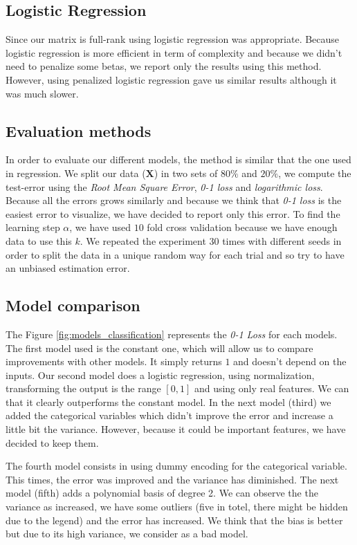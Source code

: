 \documentclass{article} %
\begin{document}
\subsection{Logistic Regression}

Since our matrix is full-rank using logistic regression was appropriate. Because logistic regression is more efficient in term of complexity and because we didn't need to penalize some betas, we report only the results using this method. However, using penalized logistic regression gave us similar results although it was much slower.

\subsection{Evaluation methods}

In order to evaluate our different models, the method is similar that the one used in regression. We split our data ($\mathbf{X}$) in two sets of $80\%$ and $20\%$, we compute the test-error using the \textit{Root Mean Square Error}, \textit{0-1 loss} and \textit{logarithmic loss}. Because all the errors grows similarly and because we think that \textit{0-1 loss} is the easiest error to visualize, we have decided to report only this error. To find the learning step $\alpha$, we have used $10$ fold cross validation because we have enough data to use this $k$. We repeated the experiment $30$ times with different seeds in order to split the data in a unique random way for each trial and so try to have an unbiased estimation error. 

\subsection{Model comparison}

The Figure \ref{fig:models_classification} represents the \textit{0-1 Loss} for each models. The first model used is the constant one, which will allow us to compare improvements with other models. It simply returns $1$ and doesn't depend on the inputs. Our second model does a logistic regression, using normalization, transforming the output is the range $[0,1]$ and using only real features. We can that it clearly outperforms the constant model. In the next model (third) we added the categorical variables which didn't improve the error and increase a little bit the variance. However, because it could be important features, we have decided to keep them.

The fourth model consists in using dummy encoding for the categorical variable. This times, the error was improved and the variance has diminished. The next model (fifth) adds a polynomial basis of degree 2. We can observe the the variance as increased, we have some outliers (five in totel, there might be hidden due to the legend) and the error has increased. We think that the bias is better but due to its high variance, we consider as a bad model.
\end{document}
